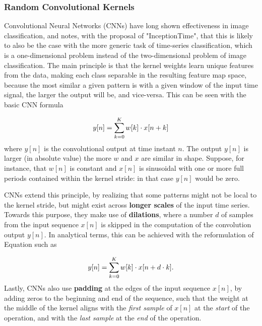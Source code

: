 \subsubsection{Random Convolutional Kernels}\label{sec:ha_rck}
Convolutional Neural Networks (CNNs) have long shown effectiveness in image classification, and \cite{Fawaz2020} notes, with the proposal of "InceptionTime", that this is likely to also be the case with the more generic task of time-series classification, which is a one-dimensional problem instead of the two-dimensional problem of image classification.
The main principle is that the kernel weights learn unique features from the data, making each class separable in the resulting feature map space, because the most similar a given pattern is with a given window of the input time signal, the larger the output will be, and vice-versa. This can be seen with the basic CNN formula

\begin{equation}\label{eq:basic_cnn_eq}
y[n] = \sum\sb{k=0}\sp{K} w[k] \cdot x[n+k]
\end{equation}
where $y[n]$ is the convolutional output at time instant $n$. The output $y[n]$ is larger (in absolute value) the more $w$ and $x$ are similar in shape. Suppose, for instance, that $w[n]$ is constant and $x[n]$ is sinusoidal with one or more full periods contained within the kernel stride: in that case $y[n]$ would be zero.

CNNs extend this principle, by realizing that some patterns might not be local to the kernel stride, but might exist across \textbf{longer scales} of the input time series. Towards this purpose, they make use of \textbf{dilations}, where a number $d$ of samples from the input sequence $x[n]$ is skipped in the computation of the convolution
output $y[n]$. In analytical terms, this can be achieved with the reformulation of Equation \label{eq:basic_cnn_eq} such as

\begin{equation}\label{eq:dil_cnn_eq}
y[n] = \sum\sb{k=0}\sp{K} w[k] \cdot x[n+ d \cdot k].
\end{equation}
Lastly, CNNs also use \textbf{padding} at the edges of the input sequence $x[n]$, by adding zeros to the beginning and end of the sequence, such that the weight at the middle of the kernel aligns with the \emph{first sample} of $x[n]$ at the \emph{start} of the operation, and with the \emph{last sample} at the \emph{end} of the operation.

